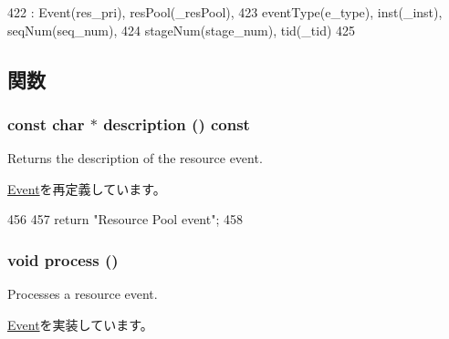 \begin{DoxyCode}
422     : Event(res_pri), resPool(_resPool),
423       eventType(e_type), inst(_inst), seqNum(seq_num),
424       stageNum(stage_num), tid(_tid)
425 { }
\end{DoxyCode}


\subsection{関数}
\hypertarget{classResourcePool_1_1ResPoolEvent_a5a14fe478e2393ff51f02e9b7be27e00}{
\subsubsection[{description}]{\setlength{\rightskip}{0pt plus 5cm}const char $\ast$ description () const}}
\label{classResourcePool_1_1ResPoolEvent_a5a14fe478e2393ff51f02e9b7be27e00}
Returns the description of the resource event. 

\hyperlink{classEvent_a130ddddf003422b413e2e891b1b80e8f}{Event}を再定義しています。


\begin{DoxyCode}
456 {
457     return "Resource Pool event";
458 }
\end{DoxyCode}
\hypertarget{classResourcePool_1_1ResPoolEvent_a2e9c5136d19b1a95fc427e0852deab5c}{
\subsubsection[{process}]{\setlength{\rightskip}{0pt plus 5cm}void process ()}}
\label{classResourcePool_1_1ResPoolEvent_a2e9c5136d19b1a95fc427e0852deab5c}
Processes a resource event. 

\hyperlink{classEvent_a142b75b68a6291400e20fb0dd905b1c8}{Event}を実装しています。


